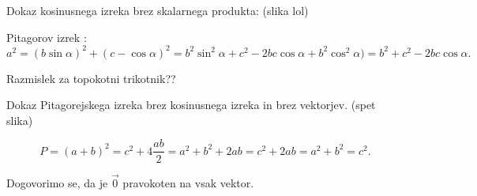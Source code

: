 \documentclass{report}
\begin{document}
Dokaz kosinusnega izreka brez skalarnega produkta: (slika lol)


Pitagorov izrek :
\[a^{2} = (b \sin \alpha)^{2} + (c -\cos \alpha)^{2} = b^{2}\sin^{2}\alpha + c^{2} - 2bc \cos \alpha + b^{2} \cos^{2} \alpha) = b^{2} + c^{2} - 2bc \cos \alpha.\]

Razmislek za topokotni trikotnik??


Dokaz Pitagorejskega izreka brez kosinusnega izreka in brez vektorjev. (spet slika)

\[
P = (a+b)^{2} = c^{2} + 4 \frac{ab}{2} = a^{2} + b^{2} + 2ab = c^{2} + 2ab = a^{2} + b^{2} = c^{2}
.\]

Dogovorimo se, da je $\vec{0}$ pravokoten na vsak vektor.

\cor{}{
\[
\vec{a} \vec{b} = 0 \iff \vec{a} \perp \vec{b}
.\]
}
\end{document}

